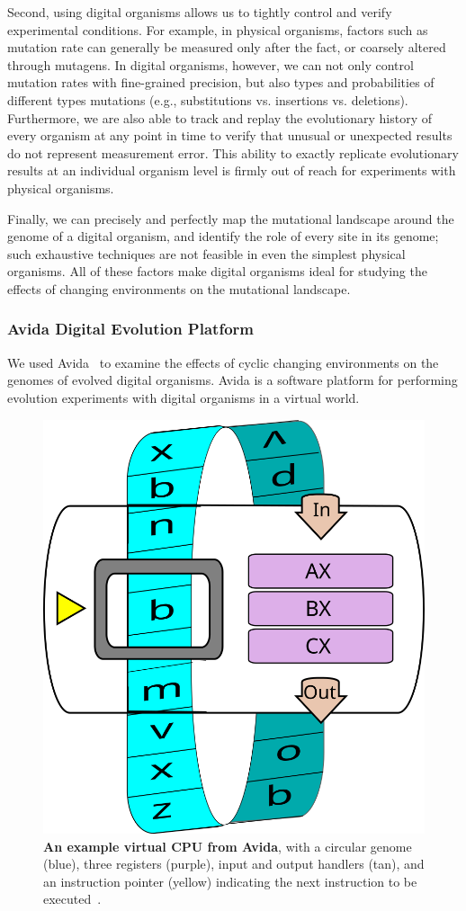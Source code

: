 \documentclass[10pt,letterpaper,final]{article}
\begin{document}
Second, using digital organisms allows us to tightly control and verify experimental conditions. For example, in physical organisms, factors such as mutation rate can generally be measured only after the fact, or coarsely altered through mutagens. In digital organisms, however, we can not only control mutation rates with fine-grained precision, but also types and probabilities of different types mutations (e.g., substitutions vs. insertions vs. deletions). Furthermore, we are also able to track and replay the evolutionary history of every organism at any point in time to verify that unusual or unexpected results do not represent measurement error. This ability to exactly replicate evolutionary results at an individual organism level is firmly out of reach for experiments with physical organisms.

Finally, we can precisely and perfectly map the mutational landscape around the genome of a digital organism, and identify the role of every site in its genome\cite{ofria_evolution_2002}; such exhaustive techniques are not feasible in even the simplest physical organisms.  All of these factors make digital organisms ideal for studying the effects of changing environments on the mutational landscape.

\subsubsection*{Avida Digital Evolution Platform}
We used Avida~\cite{lenski_evolutionary_2003} to examine the effects of cyclic changing environments on the genomes of evolved digital organisms. Avida is a software platform for performing evolution experiments with digital organisms in a virtual world.

\begin{figure}[!h]
\includegraphics[width=0.65\columnwidth]{figures/methods/squishedCPU_extra.png}
\caption{{\bf An example virtual CPU from Avida}, with a circular genome (blue), three registers (purple), input and output handlers (tan), and an instruction pointer (yellow) indicating the next instruction to be executed~\cite{canino-koning_evolution_2016}.%
}\label{fig:cpu}
\end{figure}
\end{document}
